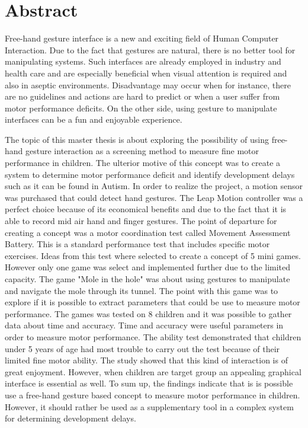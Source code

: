 \chapter*{Abstract}




Free-hand gesture interface is a new and exciting field of Human Computer Interaction. Due to the fact that gestures are natural, there is no better tool for manipulating systems. Such interfaces are already employed in industry and health care and are especially beneficial when visual attention is required and also in aseptic environments. Disadvantage may occur when for instance, there are no guidelines and actions are hard to predict or when a user suffer from motor performance deficits. On the other side, using gesture to manipulate interfaces can be a fun and enjoyable experience. 

The topic of this master thesis is about exploring the possibility of using free-hand gesture interaction as a screening method to measure fine motor performance in children. The ulterior motive of this concept was to create a system to determine motor performance deficit and identify development delays such as it can be found in Autism.
In order to realize the project, a motion sensor was purchased that could detect hand gestures. The Leap Motion controller was a perfect choice because of its economical benefits and due to the fact that it is able to record mid air hand and finger gestures. The point of departure for creating a concept was a motor coordination test called Movement Assessment Battery. This is a standard performance test that includes specific motor exercises. Ideas from this test where selected to create a concept of 5 mini games. However only one game was select and implemented further due to the limited capacity. The game "Mole in the hole" was about using gestures to manipulate and navigate the mole through its tunnel. The point with this game was to explore if it is possible to extract parameters that could be use to measure motor performance. The games was tested on 8 children and it was possible to gather data about time and accuracy. Time and accuracy were useful parameters in order to measure motor performance. The ability test demonstrated that children under 5 years of age had most trouble to carry out the test because of their limited fine motor ability. 
The study showed that this kind of interaction is of great enjoyment. However, when children are target group an appealing graphical interface is essential as well.  
To sum up, the findings indicate that is is possible use a free-hand gesture based concept to measure motor performance in children. However, it should rather be used as a supplementary tool in a complex system for determining development delays.\\

